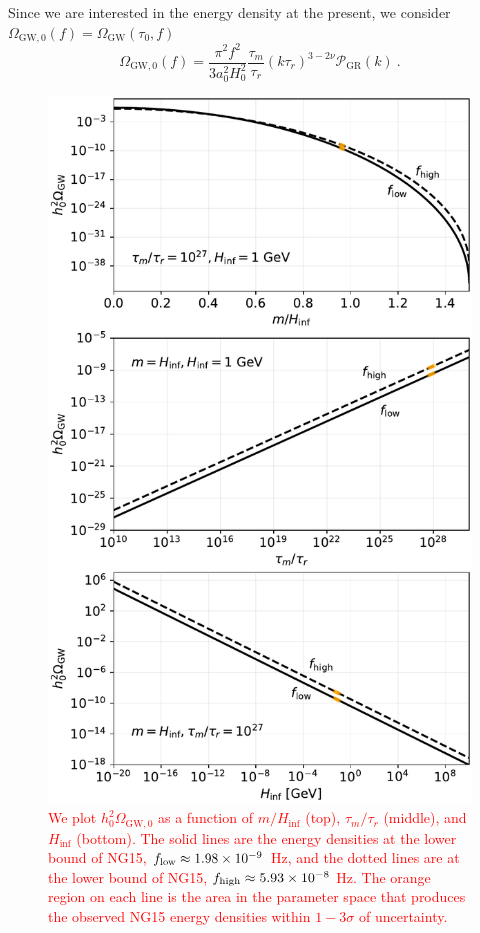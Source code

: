 \documentclass[prd,twocolumn,aps,psfig,nofootinbib,nobibnotes,superscriptaddress,preprintnumbers,times]{revtex4-2}
\def\red{\textcolor{red}}
\begin{document}
Since we are interested in the energy density at the present, we consider $\Omega_{\text{GW},0}(f) = \Omega_\text{GW}(\tau_0,f)$
\begin{equation}\label{eqn:om_gw_0}
    \Omega_{\text{GW},0}(f) = \frac{\pi^2f^2}{3a_0^2 H_0^2}\frac{\tau_m}{\tau_r}(k\tau_r)^{3-2\nu}\mathcal{P}_{\text{GR}}(k) \ .
\end{equation}

\begin{figure}
\includegraphics[width=\linewidth]{fig2.pdf}
\caption{\red{We plot $h_0^2\Omega_{\text{GW},0}$ as a function of $m/H_{\inf}$ (top), $\tau_m/\tau_r$ (middle), and $H_{\inf}$ (bottom). The solid lines are the energy densities at the lower bound of NG15, $f_{\rm low} \approx 1.98\times 10^{-9}$ Hz, and the dotted lines are at the lower bound of NG15, $f_{\rm high} \approx 5.93\times 10^{-8}$ Hz. The orange region on each line is the area in the parameter space that produces the observed NG15 energy densities within $1-3\sigma$ of uncertainty.}}
\label{fig:contours}
\end{figure}
\end{document}
